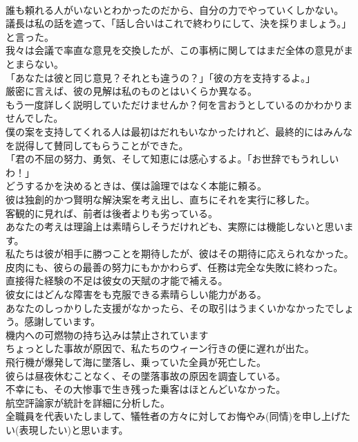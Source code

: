 \documentclass[8pt]{extreport}
\begin{document}
\begin{CJK}{UTF8}{min}
\\	誰も頼れる人がいないとわかったのだから、自分の力でやっていくしかない。
\\	議長は私の話を遮って、「話し合いはこれで終わりにして、決を採りましょう。」と言った。
\\	我々は会議で率直な意見を交換したが、この事柄に関してはまだ全体の意見がまとまらない。
\\	「あなたは彼と同じ意見？それとも違うの？」「彼の方を支持するよ。」
\\	厳密に言えば、彼の見解は私のものとはいくらか異なる。
\\	もう一度詳しく説明していただけませんか？何を言おうとしているのかわかりませんでした。
\\	僕の案を支持してくれる人は最初はだれもいなかったけれど、最終的にはみんなを説得して賛同してもらうことができた。
\\	「君の不屈の努力、勇気、そして知恵には感心するよ。「お世辞でもうれしいわ！」
\\	どうするかを決めるときは、僕は論理ではなく本能に頼る。
\\	彼は独創的かつ賢明な解決案を考え出し、直ちにそれを実行に移した。
\\	客観的に見れば、前者は後者よりも劣っている。
\\	あなたの考えは理論上は素晴らしそうだけれども、実際には機能しないと思います。
\\	私たちは彼が相手に勝つことを期待したが、彼はその期待に応えられなかった。
\\	皮肉にも、彼らの最善の努力にもかかわらず、任務は完全な失敗に終わった。
\\	直接得た経験の不足は彼女の天賦の才能で補える。
\\	彼女にはどんな障害をも克服できる素晴らしい能力がある。
\\	あなたのしっかりした支援がなかったら、その取引はうまくいかなかったでしょう。感謝しています。
\\	機内への可燃物の持ち込みは禁止されています
\\	ちょっとした事故が原因で、私たちのウィーン行きの便に遅れが出た。
\\	飛行機が爆発して海に墜落し、乗っていた全員が死亡した。
\\	彼らは昼夜休むことなく、その墜落事故の原因を調査している。
\\	不幸にも、その大惨事で生き残った乗客はほとんどいなかった。
\\	航空評論家が統計を詳細に分析した。
\\	全職員を代表いたしまして、犠牲者の方々に対してお悔やみ(同情)を申し上げたい(表現したい)と思います。

\end{CJK}
\end{document}
